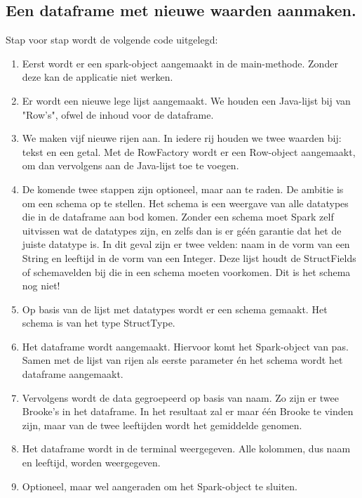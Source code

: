 \documentclass[a4paper,10pt,twoside]{report}
\begin{document}
\subsection{Een dataframe met nieuwe waarden aanmaken.}

Stap voor stap wordt de volgende code uitgelegd:

\begin{enumerate}
	\item Eerst wordt er een spark-object aangemaakt in de main-methode. Zonder deze kan de applicatie niet werken.
	\item Er wordt een nieuwe lege lijst aangemaakt. We houden een Java-lijst bij van "Row's", ofwel de inhoud voor de dataframe.
	\item We maken vijf nieuwe rijen aan. In iedere rij houden we twee waarden bij: tekst en een getal. Met de RowFactory wordt er een Row-object aangemaakt, om dan vervolgens aan de Java-lijst toe te voegen.
	\item De komende twee stappen zijn optioneel, maar aan te raden. De ambitie is om een schema op te stellen. Het schema is een weergave van alle datatypes die in de dataframe aan bod komen. Zonder een schema moet Spark zelf uitvissen wat de datatypes zijn, en zelfs dan is er géén garantie dat het de juiste datatype is. In dit geval zijn er twee velden: naam in de vorm van een String en leeftijd in de vorm van een Integer. Deze lijst houdt de StructFields of schemavelden bij die in een schema moeten voorkomen. Dit is het schema nog niet!
	\item Op basis van de lijst met datatypes wordt er een schema gemaakt. Het schema is van het type StructType.
	\item Het dataframe wordt aangemaakt. Hiervoor komt het Spark-object van pas. Samen met de lijst van rijen als eerste parameter én het schema wordt het dataframe aangemaakt.
	\item Vervolgens wordt de data gegroepeerd op basis van naam. Zo zijn er twee Brooke's in het dataframe. In het resultaat zal er maar één Brooke te vinden zijn, maar van de twee leeftijden wordt het gemiddelde genomen.
	\item Het dataframe wordt in de terminal weergegeven. Alle kolommen, dus naam en leeftijd, worden weergegeven.
	\item Optioneel, maar wel aangeraden om het Spark-object te sluiten.
\end{enumerate}
\end{document}
